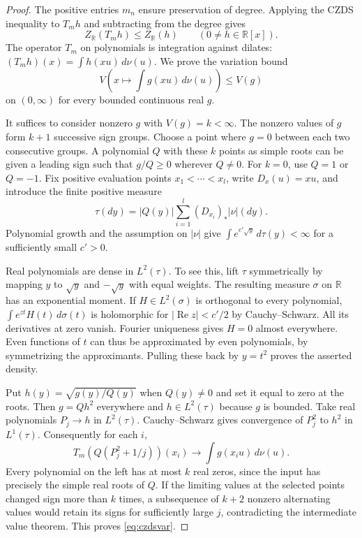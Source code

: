 \documentclass[11pt,a4paper]{article}
\begin{document}
\begin{proof}
The positive entries $m_n$ ensure preservation of degree. Applying the
CZDS inequality to $T_m h$ and subtracting from the degree gives
\[
   Z_{\mathbb R}(T_m h)\le Z_{\mathbb R}(h)
         \qquad(0\ne h\in\mathbb R[x]).
\]
The operator $T_m$ on polynomials is integration against dilates:
$(T_m h)(x)=\int h(xu)\,d\nu(u)$. We prove the variation bound
\begin{equation}\label{eq:czdsvar}
    V\!\left(x\mapsto\int g(xu)\,d\nu(u)\right)\le V(g)
\end{equation}
on $(0,\infty)$ for every bounded continuous real $g$.

It suffices to consider nonzero $g$ with $V(g)=k<\infty$.
The nonzero values of $g$ form $k+1$ successive sign groups.
Choose a point where $g=0$ between each two consecutive groups.
A polynomial $Q$ with these $k$ points as simple roots can be given a
leading sign such that $g/Q\ge0$ wherever $Q\ne0$. For $k=0$, use
$Q=1$ or $Q=-1$. Fix positive evaluation points $x_1<\cdots<x_l$,
write $D_x(u)=xu$, and introduce the finite positive measure
\[
     \tau(dy)=|Q(y)|\sum_{i=1}^l (D_{x_i})_*|\nu|(dy).
\]
Polynomial growth and the assumption on $|\nu|$ give
$\int e^{c'\sqrt y}\,d\tau(y)<\infty$ for a sufficiently small
$c'>0$.

Real polynomials are dense in $L^2(\tau)$. To see this, lift $\tau$
symmetrically by mapping $y$ to $\sqrt y$ and $-\sqrt y$ with equal
weights. The resulting measure $\sigma$ on $\mathbb R$ has
an exponential moment. If $H\in L^2(\sigma)$ is orthogonal to every
polynomial, $\int e^{zt}H(t)\,d\sigma(t)$ is holomorphic for
$|\operatorname{Re}z|<c'/2$ by Cauchy--Schwarz. All its derivatives
at zero vanish. Fourier uniqueness gives $H=0$ almost everywhere.
Even functions of $t$ can thus be approximated by even polynomials,
by symmetrizing the approximants. Pulling these back by $y=t^2$ proves
the asserted density.

Put $h(y)=\sqrt{g(y)/Q(y)}$ when $Q(y)\ne0$ and set it equal to zero
at the roots. Then $g=Qh^2$ everywhere and $h\in L^2(\tau)$
because $g$ is bounded. Take real polynomials $P_j\to h$ in
$L^2(\tau)$. Cauchy--Schwarz gives convergence of $P_j^2$ to $h^2$
in $L^1(\tau)$. Consequently for each $i$,
\[
 T_m\!\left(Q(P_j^2+1/j)\right)(x_i)
        \longrightarrow\int g(x_i u)\,d\nu(u).
\]
Every polynomial on the left has at most $k$ real zeros, since the
input has precisely the simple real roots of $Q$. If the limiting
values at the selected points changed sign more than $k$ times, a
subsequence of $k+2$ nonzero alternating values would retain its signs
for sufficiently large $j$, contradicting the intermediate value
theorem. This proves \eqref{eq:czdsvar}.


\end{proof}
\end{document}
